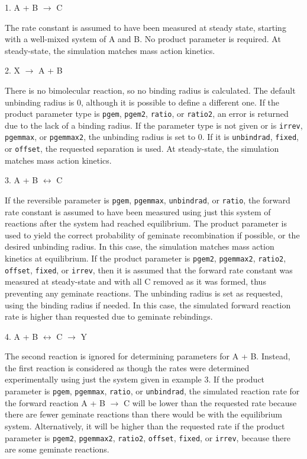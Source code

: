 \documentclass {book}
\newcommand {\ttt} {\texttt}
\begin{document}
\begin{description}
\item{1. A + B $\rightarrow$ C}

The rate constant is assumed to have been measured at steady state, starting with a well-mixed system of A and B. No product parameter is required. At steady-state, the simulation matches mass action kinetics.

\item{2. X $\rightarrow$ A + B}

There is no bimolecular reaction, so no binding radius is calculated. The default unbinding radius is 0, although it is possible to define a different one. If the product parameter type is \ttt{pgem}, \ttt{pgem2}, \ttt{ratio}, or \ttt{ratio2}, an error is returned due to the lack of a binding radius. If the parameter type is not given or is \ttt{irrev}, \ttt{pgemmax}, or \ttt{pgemmax2}, the unbinding radius is set to 0. If it is \ttt{unbindrad}, \ttt{fixed}, or \ttt{offset}, the requested separation is used. At steady-state, the simulation matches mass action kinetics.

\item{3. A + B $\leftrightarrow$ C}

If the reversible parameter is \ttt{pgem}, \ttt{pgemmax}, \ttt{unbindrad}, or \ttt{ratio}, the forward rate constant is assumed to have been measured using just this system of reactions after the system had reached equilibrium. The product parameter is used to yield the correct probability of geminate recombination if possible, or the desired unbinding radius. In this case, the simulation matches mass action kinetics at equilibrium. If the product parameter is \ttt{pgem2}, \ttt{pgemmax2}, \ttt{ratio2}, \ttt{offset}, \ttt{fixed}, or \ttt{irrev}, then it is assumed that the forward rate constant was measured at steady-state and with all C removed as it was formed, thus preventing any geminate reactions. The unbinding radius is set as requested, using the binding radius if needed. In this case, the simulated forward reaction rate is higher than requested due to geminate rebindings.

\item{4. A + B $\leftrightarrow$ C $\rightarrow$ Y}

The second reaction is ignored for determining parameters for A + B. Instead, the first reaction is considered as though the rates were determined experimentally using just the system given in example 3. If the product parameter is \ttt{pgem}, \ttt{pgemmax}, \ttt{ratio}, or \ttt{unbindrad}, the simulated reaction rate for the forward reaction A + B $\rightarrow$ C will be lower than the requested rate because there are fewer geminate reactions than there would be with the equilibrium system. Alternatively, it will be higher than the requested rate if the product parameter is \ttt{pgem2}, \ttt{pgemmax2}, \ttt{ratio2}, \ttt{offset}, \ttt{fixed}, or \ttt{irrev}, because there are some geminate reactions.


\end{description}
\end{document}
